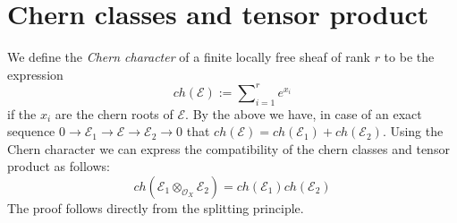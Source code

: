 \section{Chern classes and tensor product}
\label{section-chern-classes-tensor}

\noindent
We define the {\it Chern character} of a finite locally free
sheaf of rank $r$ to be the expression
$$
ch({\mathcal E}) := \sum\nolimits_{i=1}^r e^{x_i}
$$
if the $x_i$ are the chern roots of ${\mathcal E}$. By the above
we have, in case of an exact sequence
$
0
\to
{\mathcal E}_1
\to 
{\mathcal E}
\to 
{\mathcal E}_2
\to 
0
$
that $ch({\mathcal E}) = ch({\mathcal E}_1) + ch({\mathcal E}_2)$. 
Using the Chern character we can express the compatibility
of the chern classes and tensor product as follows:
$$
ch({\mathcal E}_1 \otimes_{{\mathcal O}_X} {\mathcal E}_2) =
ch({\mathcal E}_1) ch({\mathcal E}_2)
$$
The proof follows directly from the splitting principle.




















